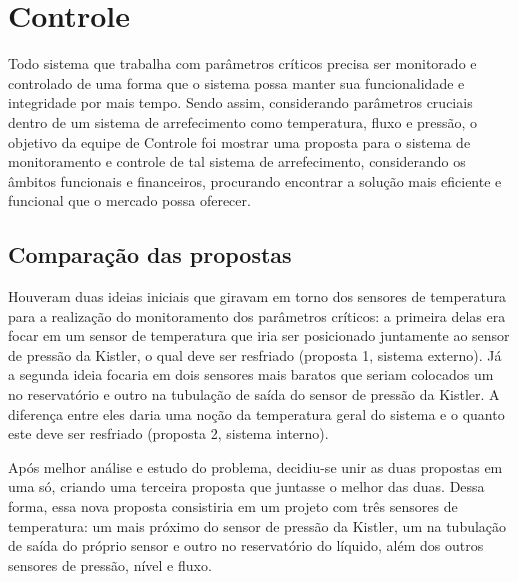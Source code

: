 
\section{Controle}
Todo sistema que trabalha com parâmetros críticos precisa ser monitorado e controlado de uma forma que o sistema possa manter sua funcionalidade e integridade por mais tempo.
Sendo assim, considerando parâmetros cruciais dentro de um sistema de arrefecimento como temperatura, fluxo e pressão, 
o objetivo da equipe de Controle foi mostrar uma proposta para o sistema de monitoramento e controle de tal sistema de arrefecimento,  considerando os âmbitos funcionais e financeiros, 
procurando encontrar a solução mais eficiente e funcional que o mercado possa oferecer.
\subsection{Comparação das propostas}
Houveram duas ideias iniciais que giravam em torno dos sensores de temperatura para a realização do monitoramento dos parâmetros críticos: a primeira delas era focar em um sensor de temperatura que iria ser posicionado juntamente ao sensor 
de pressão da Kistler, o qual deve ser resfriado (proposta 1, sistema externo). 
Já a segunda ideia focaria em dois sensores mais baratos que seriam colocados um no 
reservatório e outro na tubulação de saída do sensor de pressão da Kistler. A diferença 
entre eles daria uma noção da temperatura geral do sistema e o quanto este deve ser 
resfriado (proposta 2, sistema interno).

Após melhor análise e estudo do problema, decidiu-se unir as duas propostas em uma só, criando uma terceira proposta que juntasse o melhor das duas.
Dessa forma, essa nova proposta consistiria em um projeto com três sensores de temperatura: um mais próximo do sensor de pressão da Kistler, um na tubulação de saída do próprio sensor e outro no reservatório do líquido, além dos outros sensores de pressão, nível e fluxo.

